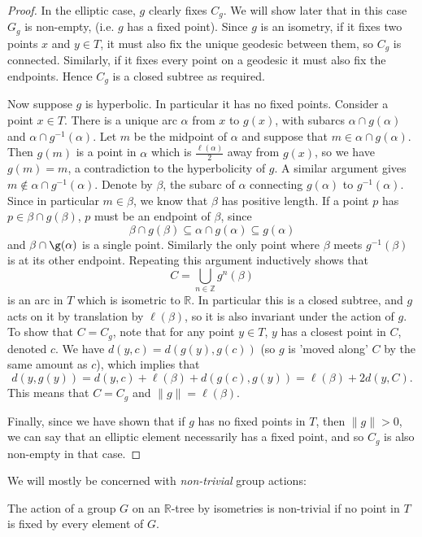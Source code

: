 \begin{proof}
    In the elliptic case, $g$ clearly fixes $C_g$. We will show later that in this case $G_g$ is non-empty, (i.e. $g$ has a fixed point). Since $g$ is an isometry, if it fixes two points $x$ and $y\in T$, it must also fix the unique geodesic between them, so $C_g$ is connected. Similarly, if it fixes every point on a geodesic it must also fix the endpoints. Hence $C_g$ is a closed subtree as required.

    Now suppose $g$ is hyperbolic. In particular it has no fixed points. Consider a point $x\in T$. There is a unique arc $\alpha$ from $x$ to $g(x)$, with subarcs $\alpha \cap g(\alpha)$ and $\alpha \cap g^{-1}(\alpha)$. Let $m$ be the midpoint of $\alpha$ and suppose that $m\in \alpha \cap g(\alpha)$. Then $g(m)$ is a point in $\alpha$ which is $\frac{\ell(\alpha)}{2}$ away from $g(x)$, so we have $g(m)=m$, a contradiction to the hyperbolicity of $g$. A similar argument gives $m\notin \alpha \cap g^{-1}(\alpha)$. Denote by $\beta$, the subarc of $\alpha$ connecting $g(\alpha)$ to $g^{-1}(\alpha)$. Since in particular $m\in \beta$, we know that $\beta$ has positive length. If a point $p$ has $p\in \beta\cap g(\beta)$, $p$ must be an endpoint of $\beta$, since \[\beta\cap g(\beta)\subseteq\alpha\cap g(\alpha)\subseteq g(\alpha)\] and $\beta\cap\g(\alpha)$ is a single point. Similarly the only point where $\beta$ meets $g^{-1}(\beta)$ is at its other endpoint. Repeating this argument inductively shows that \[C=\underset{n\in\mathbb{Z}}{\bigcup}g^n(\beta)\] is an arc in $T$ which is isometric to $\mathbb{R}$. In particular this is a closed subtree, and $g$ acts on it by translation by $\ell(\beta)$, so it is also invariant under the action of $g$. To show that $C=C_g$, note that for any point $y\in T$, $y$ has a closest point in $C$, denoted $c$. We have $d(y,c)=d(g(y),g(c))$ (so $g$ is 'moved along' $C$ by the same amount as $c$), which implies that \[d(y,g(y))=d(y,c)+\ell(\beta)+d(g(c),g(y))=\ell(\beta)+2d(y,C).\] This means that $C=C_g$ and $\lVert g\rVert=\ell(\beta)$.

    Finally, since we have shown that if $g$ has no fixed points in $T$, then $\lVert g\rVert>0$, we can say that an elliptic element necessarily has a fixed point, and so $C_g$ is also non-empty in that case.
\end{proof}

We will mostly be concerned with \textit{non-trivial} group actions:
\begin{definition}
    The action of a group $G$ on an $\mathbb{R}$-tree by isometries is \textnormal{non-trivial} if no point in $T$ is fixed by every element of $G$.
\end{definition}

